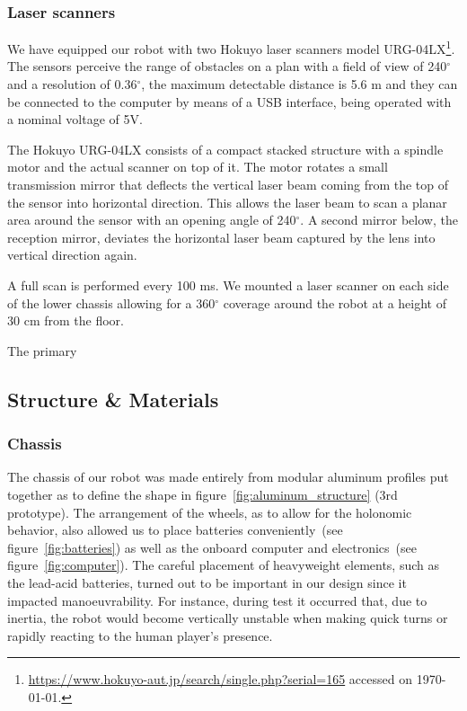 \subsubsection{Laser scanners}\label{sec:lasers_hokuyo}
We have equipped our robot with two Hokuyo laser scanners model URG-04LX\footnote{\url{https://www.hokuyo-aut.jp/search/single.php?serial=165} accessed on \today.}. The sensors perceive the range of obstacles on a plan with a field of view of 240$^\circ$ and a resolution of 0.36$^\circ$, the maximum detectable distance is 5.6 m and they can be connected to the computer by means of a USB interface, being operated with a nominal voltage of 5V.

The Hokuyo URG-04LX consists of a compact stacked structure with a spindle motor and the actual scanner on top of it. The motor rotates a small transmission mirror that deflects the vertical laser beam coming from the top of the sensor into horizontal direction. This allows the laser beam to scan a planar area around the sensor with an opening angle of 240$^\circ$. A second mirror below, the reception mirror, deviates the horizontal laser beam captured by the lens into vertical direction again.


A full scan is performed every 100 ms. We mounted a laser scanner on each side of the lower chassis allowing for a 360$^\circ$ coverage around the robot at a height of 30 cm from the floor.

The primary 

\subsection{Structure \& Materials}
\subsubsection{Chassis}
The chassis of our robot was made entirely from modular aluminum profiles put together as to define the shape in figure~\ref{fig:aluminum_structure} (3rd prototype). The arrangement of the wheels, as to allow for the holonomic behavior, also allowed us to place batteries conveniently~(see figure~\ref{fig:batteries}) as well as the onboard computer and electronics~(see figure~\ref{fig:computer}). The careful placement of heavyweight elements, such as the lead-acid batteries, turned out to be important in our design since it impacted manoeuvrability. For instance, during test it occurred that, due to inertia, the robot would become vertically unstable when making quick turns or rapidly reacting to the human player's presence. 

